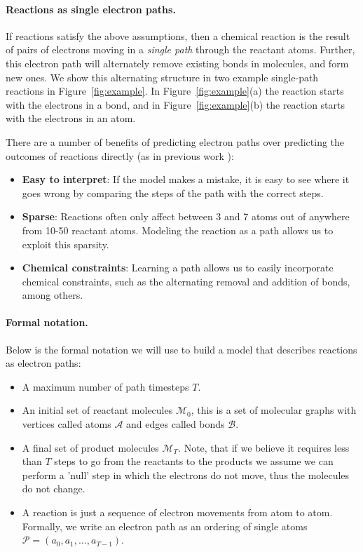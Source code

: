 \documentclass{article}
\newcommand{\Mc}{{\mathcal{M}}}
\newcommand{\Bc}{{\mathcal{B}}}
\newcommand{\Ac}{{\mathcal{A}}}
\newcommand{\Pc}{{\mathcal{P}}}
\newcommand{\bb}{{\mathbf{b}}}
\newcommand{\ab}{{\mathbf{a}}}
\newcommand{\mb}{{\mathbf{m}}}
\newcommand{\Pb}{{\mathbf{P}}}
\begin{document}
\paragraph{Reactions as single electron paths.}
If reactions satisfy the above assumptions, then a chemical reaction is the result of pairs of electrons moving in a \emph{single path} through the reactant atoms. Further, this electron path will alternately remove existing bonds in molecules, and form new ones. We show this alternating structure in two example single-path reactions in Figure~\ref{fig:example}. In Figure~\ref{fig:example}(a) the reaction starts with the electrons in a bond, and in Figure~\ref{fig:example}(b) the reaction starts with the electrons in an atom. 

There are a number of benefits of predicting electron paths over predicting the outcomes of reactions directly (as in previous work \cite{jin2017predicting,schwaller2017found}):
\begin{itemize}
\item \textbf{Easy to interpret}: If the model makes a mistake, it is easy to see where it goes wrong by comparing the steps of the path with the correct steps.
\item \textbf{Sparse}: Reactions often only affect between 3 and 7 atoms out of anywhere from 10-50 reactant atoms. Modeling the reaction as a path allows us to exploit this sparsity.
\item \textbf{Chemical constraints}: Learning a path allows us to easily incorporate chemical constraints, such as the alternating removal and addition of bonds, among others.
\end{itemize}

\paragraph{Formal notation.}
Below is the formal notation we will use to build a model that describes reactions as electron paths:
\begin{itemize}
\item A maximum number of path timesteps $T$.
\item An initial set of reactant molecules $\Mc_0$, this is a set of molecular graphs with vertices called atoms $\Ac$ and edges called bonds $\Bc$. %
\item A final set of product molecules $\Mc_T$. %
Note, that if we believe it requires less than $T$ steps to go from the reactants to the products we assume we can perform a 'null' step in which the electrons do not move, thus the molecules do not change.
\item A reaction is just a sequence of electron movements from atom to atom. Formally, we write an electron path as an ordering of single atoms $\Pc = (a_0, a_1, \ldots, a_{T-1})$. %
\end{itemize}
\end{document}
